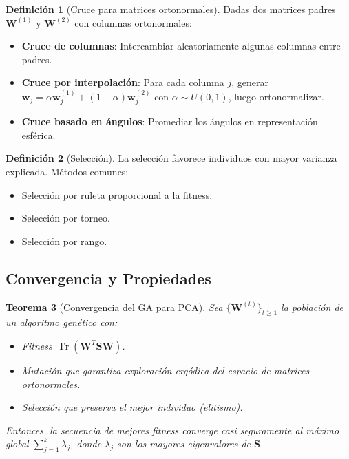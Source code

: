 \documentclass[11pt,a4paper]{article}
\theoremstyle{plain}
\newtheorem{theorem}{Teorema}[section]
\theoremstyle{definition}
\newtheorem{definition}[theorem]{Definición}
\theoremstyle{remark}
\newcommand{\1}{\mathbf{1}}
\begin{document}
\begin{definition}[Cruce para matrices ortonormales]
Dadas dos matrices padres $\mathbf{W}^{(1)}$ y $\mathbf{W}^{(2)}$ con columnas ortonormales:
\begin{itemize}
\item \textbf{Cruce de columnas}: Intercambiar aleatoriamente algunas columnas entre padres.
\item \textbf{Cruce por interpolación}: Para cada columna $j$, generar $\tilde{\mathbf{w}}_j = \alpha \mathbf{w}_j^{(1)} + (1-\alpha) \mathbf{w}_j^{(2)}$ con $\alpha \sim U(0,1)$, luego ortonormalizar.
\item \textbf{Cruce basado en ángulos}: Promediar los ángulos en representación esférica.
\end{itemize}
\end{definition}

\begin{definition}[Selección]
La selección favorece individuos con mayor varianza explicada. Métodos comunes:
\begin{itemize}
\item Selección por ruleta proporcional a la fitness.
\item Selección por torneo.
\item Selección por rango.
\end{itemize}
\end{definition}

\subsection{Convergencia y Propiedades}

\begin{theorem}[Convergencia del GA para PCA]
\label{thm:pca_ga_convergence}
Sea $\{\mathbf{W}^{(t)}\}_{t\geq 1}$ la población de un algoritmo genético con:
\begin{itemize}
\item Fitness $\operatorname{Tr}(\mathbf{W}^T \mathbf{S} \mathbf{W})$.
\item Mutación que garantiza exploración ergódica del espacio de matrices ortonormales.
\item Selección que preserva el mejor individuo (elitismo).
\end{itemize}
Entonces, la secuencia de mejores fitness converge casi seguramente al máximo global $\sum_{j=1}^k \lambda_j$, donde $\lambda_j$ son los mayores eigenvalores de $\mathbf{S}$.
\end{theorem}
\end{document}
